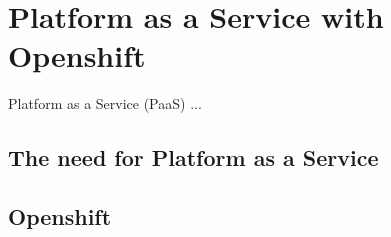 \chapter{Platform as a Service with Openshift}
\label{cha:paas}
Platform as a Service (PaaS) ...

\section{The need for Platform as a Service}
\label{sec:paas-need-for-paas}

\section{Openshift}
\label{sec:paas-kubernetes}